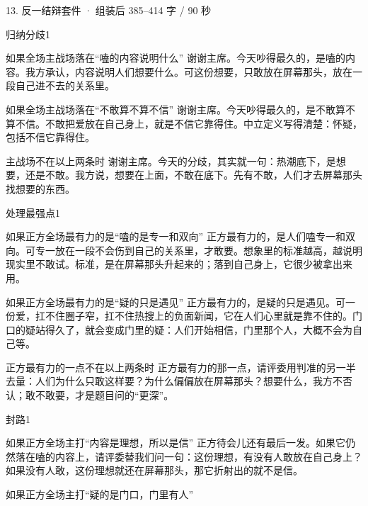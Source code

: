 \documentclass[script,con]{debate}
\begin{document}
\begin{kit}{13. 反一结辩}{套件 · 组装后 385–414 字 / 90 秒}
\begin{pick}{归纳分歧}{1}
\begin{module}{如果全场主战场落在“嗑的内容说明什么”}
谢谢主席。今天吵得最久的，是嗑的内容。我方承认，内容说明人们想要什么。可这份想要，只敢放在屏幕那头，放在一段自己进不去的关系里。
\end{module}
\begin{module}{如果全场主战场落在“不敢算不算不信”}
谢谢主席。今天吵得最久的，是不敢算不算不信。不敢把爱放在自己身上，就是不信它靠得住。中立定义写得清楚：怀疑，包括不信它靠得住。
\end{module}
\begin{fallback}{主战场不在以上两条时}
谢谢主席。今天的分歧，其实就一句：热潮底下，是想要，还是不敢。我方说，想要在上面，不敢在底下。先有不敢，人们才去屏幕那头找想要的东西。
\end{fallback}
\end{pick}
\begin{pick}{处理最强点}{1}
\begin{module}{如果正方全场最有力的是“嗑的是专一和双向”}
正方最有力的，是人们嗑专一和双向。可专一放在一段不会伤到自己的关系里，才敢要。想象里的标准越高，越说明现实里不敢试。标准，是在屏幕那头升起来的；落到自己身上，它很少被拿出来用。
\end{module}
\begin{module}{如果正方全场最有力的是“疑的只是遇见”}
正方最有力的，是疑的只是遇见。可一份爱，扛不住圈子窄，扛不住热搜上的负面新闻，它在人们心里就是靠不住的。门口的疑站得久了，就会变成门里的疑：人们开始相信，门里那个人，大概不会为自己等。
\end{module}
\begin{fallback}{正方最有力的一点不在以上两条时}
正方最有力的那一点，请评委用判准的另一半去量：人们为什么只敢这样要？为什么偏偏放在屏幕那头？想要什么，我方不否认；敢不敢要，才是题目问的“更深”。
\end{fallback}
\end{pick}
\begin{pick}{封路}{1}
\begin{module}{如果正方全场主打“内容是理想，所以是信”}
正方待会儿还有最后一发。如果它仍然落在嗑的内容上，请评委替我们问一句：这份理想，有没有人敢放在自己身上？如果没有人敢，这份理想就还在屏幕那头，那它折射出的就不是信。
\end{module}
\begin{module}{如果正方全场主打“疑的是门口，门里有人”}

\end{module}
\end{pick}
\end{kit}
\end{document}
